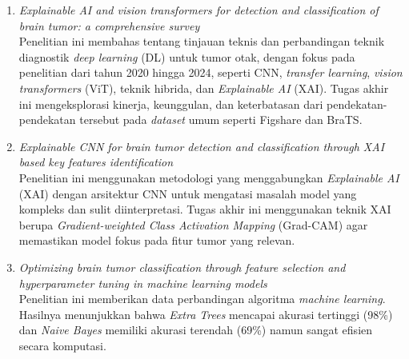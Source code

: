 \begin{enumerate}
	\item \textit{Explainable AI and vision transformers for detection and classification of brain tumor: a comprehensive survey} \cite{hosny2025explainable} \\
	Penelitian ini membahas tentang tinjauan teknis dan perbandingan teknik diagnostik \textit{deep learning} (DL) untuk tumor otak, dengan fokus pada penelitian dari tahun 2020 hingga 2024, seperti CNN, \textit{transfer learning}, \textit{vision transformers} (ViT), teknik hibrida, dan \textit{Explainable AI} (XAI). Tugas akhir ini mengeksplorasi kinerja, keunggulan, dan keterbatasan dari pendekatan-pendekatan tersebut pada \textit{dataset} umum seperti Figshare dan BraTS.
	
	\item \textit{Explainable CNN for brain tumor detection and classification through XAI based key features identification} \cite{iftikhar2025explainable}\\
	Penelitian ini menggunakan metodologi yang menggabungkan \textit{Explainable AI} (XAI) dengan arsitektur CNN untuk mengatasi masalah model yang kompleks dan sulit diinterpretasi. Tugas akhir ini menggunakan teknik XAI berupa \textit{Gradient-weighted Class Activation Mapping} (Grad-CAM) agar memastikan model fokus pada fitur tumor yang relevan.
	
	\item \textit{Optimizing brain tumor classification through feature selection and hyperparameter tuning in machine learning models} \autocite{tahosin2023optimizing}\\
	Penelitian ini memberikan data perbandingan algoritma \textit{machine learning}. Hasilnya menunjukkan bahwa \textit{Extra Trees} mencapai akurasi tertinggi (98\%) dan \textit{Naive Bayes} memiliki akurasi terendah (69\%) namun sangat efisien secara komputasi.
\end{enumerate}

